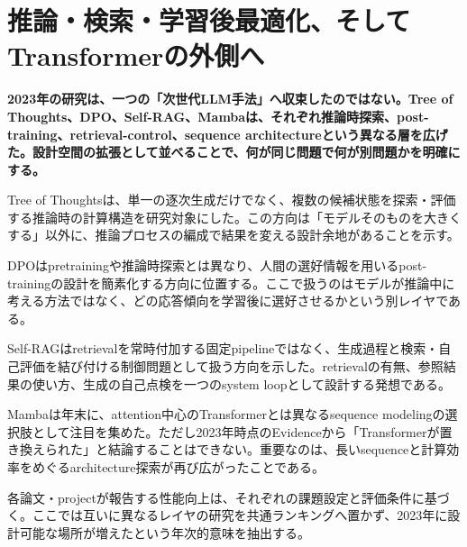 \section{推論・検索・学習後最適化、そしてTransformerの外側へ}
\label{pkg:reasoning-retrieval-architecture}
\noindent\textbf{2023年の研究は、一つの「次世代LLM手法」へ収束したのではない。Tree of Thoughts、DPO、Self-RAG、Mambaは、それぞれ推論時探索、post-training、retrieval-control、sequence architectureという異なる層を広げた。設計空間の拡張として並べることで、何が同じ問題で何が別問題かを明確にする。}\autocite{src-21aef0026892,src-5dd64e15cc75,src-8a38211129c4,src-e413c7ab8da4}

Tree of Thoughtsは、単一の逐次生成だけでなく、複数の候補状態を探索・評価する推論時の計算構造を研究対象にした。この方向は「モデルそのものを大きくする」以外に、推論プロセスの編成で結果を変える設計余地があることを示す。\autocite{src-8a38211129c4}


DPOはpretrainingや推論時探索とは異なり、人間の選好情報を用いるpost-trainingの設計を簡素化する方向に位置する。ここで扱うのはモデルが推論中に考える方法ではなく、どの応答傾向を学習後に選好させるかという別レイヤである。\autocite{src-21aef0026892}


Self-RAGはretrievalを常時付加する固定pipelineではなく、生成過程と検索・自己評価を結び付ける制御問題として扱う方向を示した。retrievalの有無、参照結果の使い方、生成の自己点検を一つのsystem loopとして設計する発想である。\autocite{src-e413c7ab8da4}


Mambaは年末に、attention中心のTransformerとは異なるsequence modelingの選択肢として注目を集めた。ただし2023年時点のEvidenceから「Transformerが置き換えられた」と結論することはできない。重要なのは、長いsequenceと計算効率をめぐるarchitecture探索が再び広がったことである。\autocite{src-5dd64e15cc75}


\begin{claimboundary}
各論文・projectが報告する性能向上は、それぞれの課題設定と評価条件に基づく。ここでは互いに異なるレイヤの研究を共通ランキングへ置かず、2023年に設計可能な場所が増えたという年次的意味を抽出する。\autocite{src-8a38211129c4}
\end{claimboundary}

